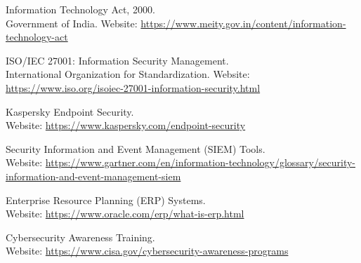 \documentclass[11pt]{article}
\begin{document}
\clearpage
\begin{thebibliography}{99}
    Information Technology Act, 2000. \\
    Government of India. Website: \url{https://www.meity.gov.in/content/information-technology-act}

    ISO/IEC 27001: Information Security Management. \\
    International Organization for Standardization. Website: \url{https://www.iso.org/isoiec-27001-information-security.html}

    Kaspersky Endpoint Security. \\
    Website: \url{https://www.kaspersky.com/endpoint-security}

    Security Information and Event Management (SIEM) Tools. \\
    Website: \url{https://www.gartner.com/en/information-technology/glossary/security-information-and-event-management-siem}

    Enterprise Resource Planning (ERP) Systems. \\
    Website: \url{https://www.oracle.com/erp/what-is-erp.html}

    Cybersecurity Awareness Training. \\
    Website: \url{https://www.cisa.gov/cybersecurity-awareness-programs}

\end{thebibliography}
\end{document}
